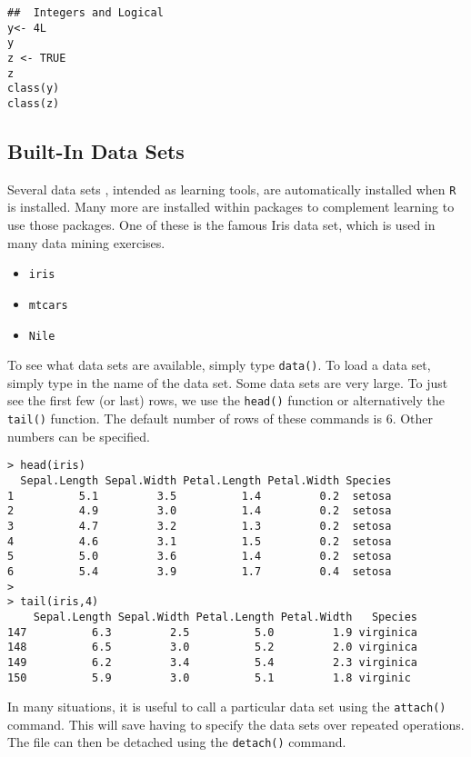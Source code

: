 \documentclass[12pt]{article}
\begin{document}
\begin{framed}
\begin{verbatim}
##  Integers and Logical
y<- 4L
y
z <- TRUE
z
class(y)
class(z)
\end{verbatim}	
\end{framed}
\newpage
\subsection*{Built-In Data Sets} %

Several data sets , intended as learning tools, are automatically installed when \texttt{R} is installed. Many more are installed within packages to complement learning to use those packages. One of these is the famous Iris data set, which is used in many data mining exercises.
\begin{itemize}
\item \texttt{iris}
\item \texttt{mtcars}
\item \texttt{Nile}
\end{itemize}
To see what data sets are available, simply type \texttt{data()}.
To load a data set, simply type in the name of the data set. Some data sets are very large. To just see the first few (or last)  rows, we use the \texttt{head()} function or alternatively the \texttt{tail()} function. The default number of rows of these commands is 6. Other numbers can be specified.
\begin{verbatim} 
> head(iris)
  Sepal.Length Sepal.Width Petal.Length Petal.Width Species
1          5.1         3.5          1.4         0.2  setosa
2          4.9         3.0          1.4         0.2  setosa
3          4.7         3.2          1.3         0.2  setosa
4          4.6         3.1          1.5         0.2  setosa
5          5.0         3.6          1.4         0.2  setosa
6          5.4         3.9          1.7         0.4  setosa
>
> tail(iris,4)
    Sepal.Length Sepal.Width Petal.Length Petal.Width   Species
147          6.3         2.5          5.0         1.9 virginica
148          6.5         3.0          5.2         2.0 virginica
149          6.2         3.4          5.4         2.3 virginica
150          5.9         3.0          5.1         1.8 virginic
\end{verbatim}
In many situations, it is useful to call a particular data set using the \texttt{attach()} command. This will save having to specify the data sets over repeated operations. The file can then be detached using 
 the \texttt{detach()} command.
\end{document}
